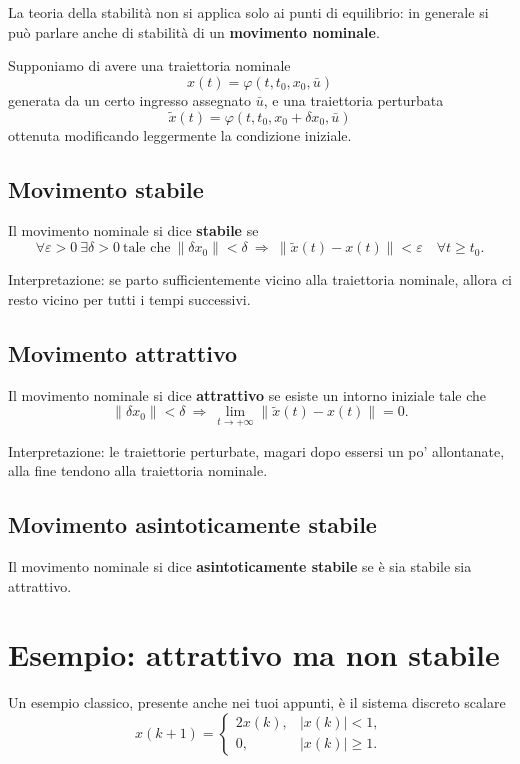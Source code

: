 La teoria della stabilità non si applica solo ai punti di equilibrio: in generale si può parlare anche di stabilità di un \textbf{movimento nominale}.

Supponiamo di avere una traiettoria nominale
\[
x(t)=\varphi(t,t_0,x_0,\bar u)
\]
generata da un certo ingresso assegnato \(\bar u\), e una traiettoria perturbata
\[
\tilde x(t)=\varphi(t,t_0,x_0+\delta x_0,\bar u)
\]
ottenuta modificando leggermente la condizione iniziale.

\subsection{Movimento stabile}
Il movimento nominale si dice \textbf{stabile} se
\[
\forall \varepsilon>0 \ \exists \delta>0 \ \text{tale che}\
\|\delta x_0\|<\delta
\ \Longrightarrow\
\|\tilde x(t)-x(t)\|<\varepsilon
\quad \forall t\ge t_0.
\]

Interpretazione: se parto sufficientemente vicino alla traiettoria nominale, allora ci resto vicino per tutti i tempi successivi.

\subsection{Movimento attrattivo}
Il movimento nominale si dice \textbf{attrattivo} se esiste un intorno iniziale tale che
\[
\|\delta x_0\|<\delta
\ \Longrightarrow\
\lim_{t\to+\infty}\|\tilde x(t)-x(t)\|=0.
\]

Interpretazione: le traiettorie perturbate, magari dopo essersi un po' allontanate, alla fine tendono alla traiettoria nominale.

\subsection{Movimento asintoticamente stabile}
Il movimento nominale si dice \textbf{asintoticamente stabile} se è sia stabile sia attrattivo.

\bigskip

\section{Esempio: attrattivo ma non stabile}

Un esempio classico, presente anche nei tuoi appunti, è il sistema discreto scalare
\[
x(k+1)=
\begin{cases}
2x(k), & |x(k)|<1,\\[0.1cm]
0, & |x(k)|\ge 1.
\end{cases}
\]

